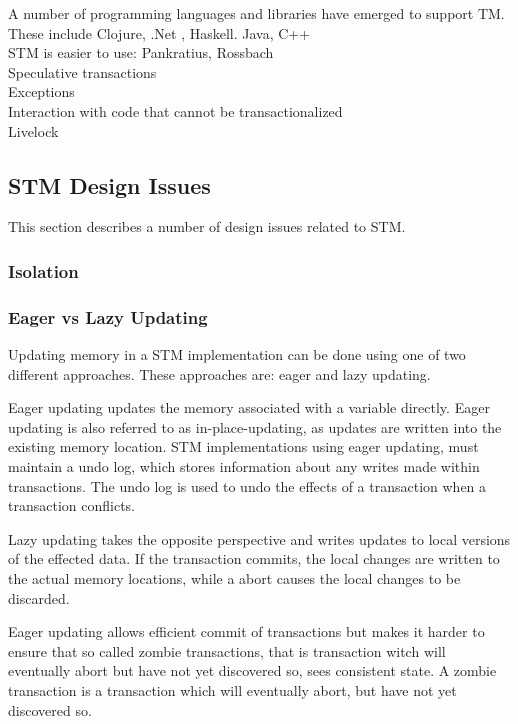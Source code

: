 


A number of programming languages and libraries have emerged to support TM. These include Clojure, .Net , Haskell. Java, C++\\
STM is easier to use: Pankratius, Rossbach\\
Speculative transactions\\

Exceptions\\
Interaction with code that cannot be transactionalized\\
Livelock\\

\subsection{\ac{STM} Design Issues}
This section describes a number of design issues related to \ac{STM}.
\subsubsection{Isolation}
\subsubsection{Eager vs Lazy Updating}
Updating memory in a \ac{STM} implementation can be done using one of two different approaches. These approaches are: eager and lazy updating.

Eager updating updates the memory associated with a variable directly. Eager updating is also referred to as in-place-updating, as updates are written into the existing memory location\cite[p. 35]{afek2011lowering}. \ac{STM} implementations using eager updating, must maintain a undo log, which stores information about any writes made within transactions. The undo log is used to undo the effects of a transaction when a transaction conflicts\cite[p. 2084]{herlihy2011tm}.

Lazy updating takes the opposite perspective and writes updates to local versions of the effected data\cite[p. 2084]{herlihy2011tm}. If the transaction commits, the local changes are written to the actual memory locations, while a abort causes the local changes to be discarded.

Eager updating allows efficient commit of transactions but makes it harder to ensure that so called zombie transactions, that is transaction witch will eventually abort but have not yet discovered so, sees consistent state\cite[p. 2084]{herlihy2011tm}. A zombie transaction is a transaction which will eventually abort, but have not yet discovered so.
